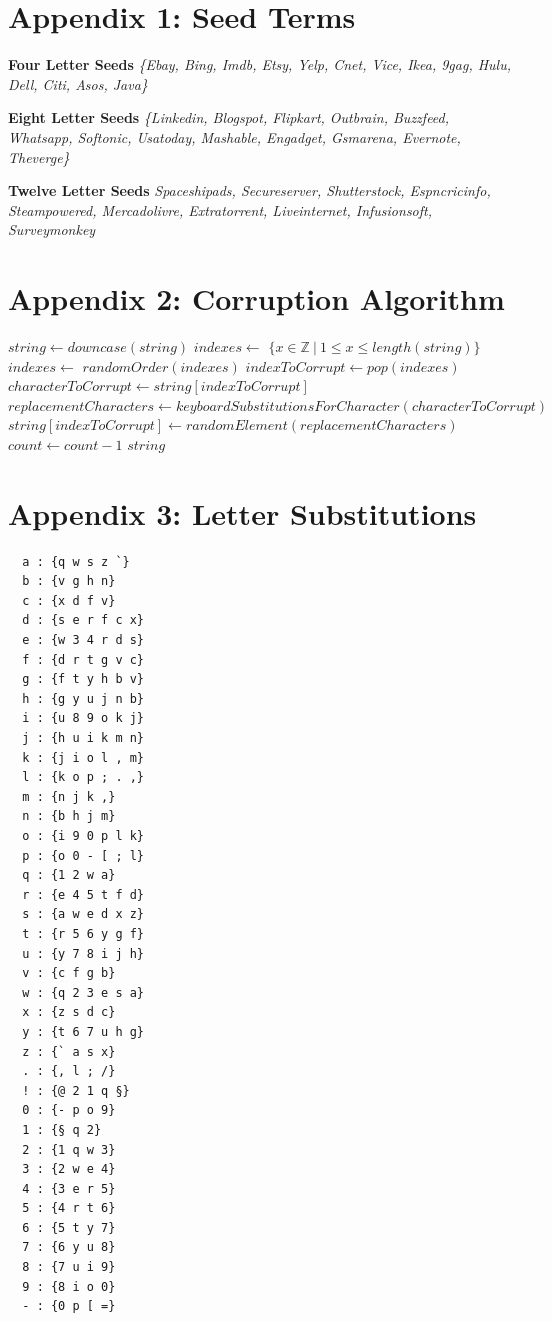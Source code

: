 \documentclass{csfourzero}
\begin{document}
\raggedbottom
\pagebreak


\pagebreak
\raggedbottom
\section{Appendix 1: Seed Terms}
\textbf{Four Letter Seeds}
\textit{\{Ebay, Bing, Imdb, Etsy, Yelp, Cnet, Vice, Ikea, 9gag, Hulu, Dell, Citi, Asos, Java\}}

\noindent
\textbf{Eight Letter Seeds}
\textit{\{Linkedin, Blogspot, Flipkart, Outbrain, Buzzfeed, Whatsapp, Softonic, Usatoday, Mashable, Engadget, Gsmarena, Evernote, Theverge\}}

\noindent
\textbf{Twelve Letter Seeds}
\textit{{Spaceshipads, Secureserver, Shutterstock, Espncricinfo, Steampowered, Mercadolivre, Extratorrent, Liveinternet, Infusionsoft, Surveymonkey}}

\pagebreak
\raggedbottom
\section{Appendix 2: Corruption Algorithm}
  \begin{algorithmic}
        \State $string \gets downcase(string)$
        \State $indexes \gets$ $\{ x \in \mathbb{Z} \ \vert \ 1 \leq x \leq length(string) \}$
        \State $indexes \gets$ $randomOrder(indexes)$
        \Repeat
        \State $indexToCorrupt \gets pop(indexes)$
        \State $characterToCorrupt \gets string[indexToCorrupt]$
        \State $replacementCharacters \gets keyboardSubstitutionsForCharacter(characterToCorrupt)$
        \State $string[indexToCorrupt] \gets randomElement(replacementCharacters)$
        \State $count \gets count - 1$
        \State \Return $string$
    \EndFunction
  \end{algorithmic}

\pagebreak
\raggedbottom
\section{Appendix 3: Letter Substitutions}
\begin{multicols}{2}
  \begin{verbatim}
  a : {q w s z `}
  b : {v g h n}
  c : {x d f v}
  d : {s e r f c x}
  e : {w 3 4 r d s}
  f : {d r t g v c}
  g : {f t y h b v}
  h : {g y u j n b}
  i : {u 8 9 o k j}
  j : {h u i k m n}
  k : {j i o l , m}
  l : {k o p ; . ,}
  m : {n j k ,}
  n : {b h j m}
  o : {i 9 0 p l k}
  p : {o 0 - [ ; l}
  q : {1 2 w a}
  r : {e 4 5 t f d}
  s : {a w e d x z}
  t : {r 5 6 y g f}
  u : {y 7 8 i j h}
  v : {c f g b}
  w : {q 2 3 e s a}
  x : {z s d c}
  y : {t 6 7 u h g}
  z : {` a s x}
  . : {, l ; /}
  ! : {@ 2 1 q §}
  0 : {- p o 9}
  1 : {§ q 2}
  2 : {1 q w 3}
  3 : {2 w e 4}
  4 : {3 e r 5}
  5 : {4 r t 6}
  6 : {5 t y 7}
  7 : {6 y u 8}
  8 : {7 u i 9}
  9 : {8 i o 0}
  - : {0 p [ =}
  \end{verbatim}
\end{multicols}
\end{document}
